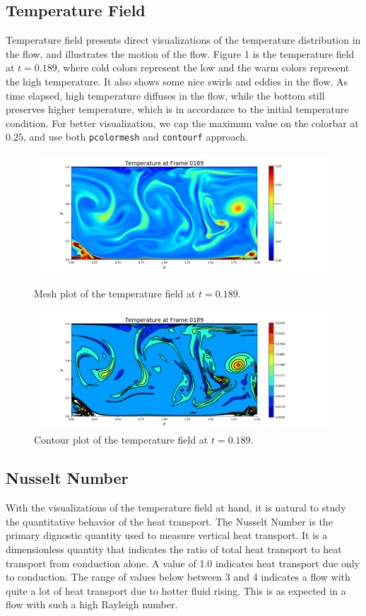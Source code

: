 \documentclass[11pt]{article} %
\begin{document}
\subsection{Temperature Field}
Temperature field presents direct visualizations of the temperature distribution in the flow, and illustrates the motion of the flow. Figure 1 is the temperature field at $t=0.189$, where cold colors represent the low and the warm colors represent the high temperature. It also shows some nice swirls and eddies in the flow. As time elapsed, high temperature diffuses in the flow, while the bottom still preserves higher temperature, which is in accordance to the initial temperature condition. For better visualization, we cap the maximum value on the colorbar 
at $0.25$, and use both \texttt{pcolormesh} and \texttt{contourf} approach.
\begin{figure}[h!]
\centering
\hspace*{-0.25in}
\includegraphics[width=1.2\textwidth]{temperature.png}
\caption{Mesh plot of the temperature field at $t=0.189$.}
\hspace*{-0.25in}
\includegraphics[width=1.2\textwidth]{temperature_contour.png}
\caption{Contour plot of the temperature field at $t=0.189$.}
\end{figure}
\newpage

\subsection{Nusselt Number}
With the visualizations of the temperature field at hand, it is natural to study the quantitative behavior of the heat transport. The Nusselt Number is the primary dignostic quantity used to measure vertical heat transport.  It is a dimensionless quantity that indicates the ratio of total heat transport to heat transport from conduction alone.  A value of 1.0 indicates heat transport due only to conduction.
The range of values below between 3 and 4 indicates a flow with quite
a lot of heat transport due to hotter fluid rising.  
This is as expected in a flow with such a high Rayleigh number.
\end{document}
